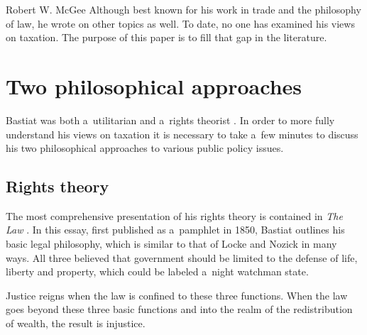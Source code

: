\begin{artengenv}{Robert W. McGee}
Although best known for his work in trade and the philosophy of law, he wrote on other topics as well. To date, no one has examined his views on taxation. The purpose of this paper is to fill that gap in the literature.



\section{Two philosophical approaches}

Bastiat was both a~utilitarian 
\parencites[][]{bastiat_ce_1850}[][]{bastiat_libre-echange_1862}[][]{bastiat_cobden_1864}[][]{bastiat_harmonies_1870}[][]{bastiat_ce_1873}[][]{bastiat_sophismes_1873}[][]{bastiat_economic_1964}[][]{bastiat_economic_1964-1}[][]{bastiat_selected_1964}[][]{bastiat_bastiat_2007}[][]{bastiat_collected_2010} %
 and a~rights theorist 
\parencites[][pp.342–393]{bastiat_ce_1873}[][]{bastiat_law_1998}[][I:~49-94]{bastiat_bastiat_2007}. %
 In order to more fully understand his views on taxation it is necessary to take a~few minutes to discuss his two philosophical approaches to various public policy issues.



\subsection{Rights theory }



The most comprehensive presentation of his rights theory is contained in \textit{The Law} 
\parencites[][pp.342–393]{bastiat_ce_1873}[][]{bastiat_law_1998}[][I:~49-94]{bastiat_bastiat_2007}. %
 In this essay, first published as a~pamphlet in 1850, Bastiat outlines his basic legal philosophy, which is similar to that of Locke 
\parencite*[][]{locke_two_1689} %
 and Nozick 
\parencite*[][]{nozick_anarchy_1974} %
 in many ways. All three believed that government should be limited to the defense of life, liberty and property, which could be labeled a~night watchman state.



Justice reigns when the law is confined to these three functions. When the law goes beyond these three basic functions and into the realm of the redistribution of wealth, the result is injustice.




\end{artengenv}
